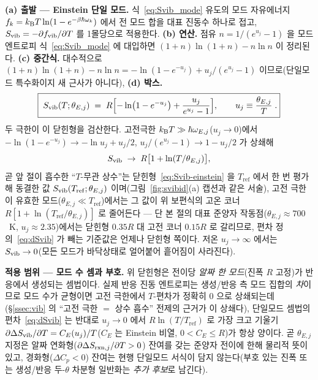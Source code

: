 \textbf{(a) 출발 --- Einstein 단일 모드.} 식~\eqref{eq:Svib_mode} 유도의 모드 자유에너지
$f_k=k_{\mathrm B} T\ln(1-e^{-\beta\hbar\omega_k})$ 에서 전 모드 합을 대표 진동수 하나로 접고, $S_{\mathrm{vib}}=-\partial
f_{\mathrm{vib}}/\partial T$ 를 1몰당으로 적용한다. \textbf{(b) 연산.} 점유 $n=1/(e^{u_j}-1)$ 을 모드 엔트로피
식~\eqref{eq:Svib_mode} 에 대입하면 $(1+n)\ln(1+n)-n\ln n$ 이 정리된다. \textbf{(c) 중간식.} 대수적으로
$(1+n)\ln(1+n)-n\ln n=-\ln(1-e^{-u_j})+u_j/(e^{u_j}-1)$ 이므로(단일모드 특수화이지 새 근사가 아니다),
\textbf{(d) 박스.}
\begin{equation}
\boxed{\;S_{\mathrm{vib}}(T;\theta_{E,j}) \;=\; R\Bigl[-\ln\bigl(1-e^{-u_j}\bigr)+\frac{u_j}{e^{u_j}-1}\Bigr],
\qquad u_j\equiv\frac{\theta_{E,j}}{T}\;.}
\label{eq:Svib-einstein}
\end{equation}
두 극한이 이 닫힌형을 검산한다. 고전극한 $k_{\mathrm B} T\gg\hbar\omega_{E,j}$($u_j\to0$)에서
$-\ln(1-e^{-u_j})\to-\ln u_j+u_j/2$, $u_j/(e^{u_j}-1)\to1-u_j/2$ 가 상쇄해
\[
S_{\mathrm{vib}}\;\to\;R\bigl[1+\ln(T/\theta_{E,j})\bigr],
\]
곧 앞 절이 흡수한 ``$T$-무관 상수''는 닫힌형~\eqref{eq:Svib-einstein} 을 $T_\mathrm{ref}$ 에서 한 번 평가해
동결한 값 $S_{\mathrm{vib}}(T_\mathrm{ref};\theta_{E,j})$ 이며(그림~\ref{fig:svibid}(a) 캡션과 같은 서술), 고전 극한이
유효한 모드($\theta_{E,j}\ll T_\mathrm{ref}$)에서는 그 값이 위 보편식의 고온 코너
$R[1+\ln(T_\mathrm{ref}/\theta_{E,j})]$ 로 줄어든다 --- 단 본 절의 대표 준양자 작동점($\theta_{E,j}{\approx}700$~K,
$u_j{\approx}2.35$)에서는 닫힌형 $0.35R$ 대 고전 코너 $0.15R$ 로 갈리므로, 편차 정의~\eqref{eq:dSvib} 가 빼는
기준값은 언제나 닫힌형 쪽이다. 저온 $u_j\to\infty$ 에서는 $S_{\mathrm{vib}}\to0$(모든 모드가 바닥상태로 얼어붙어
흩어짐이 사라진다).

\textbf{적용 범위 --- 모드 수 셈과 부호.} 위 닫힌형은 전이당 \emph{알짜 한 모드}(진폭 $R$ 고정)가 반응에서
생성되는 셈법이다. 실제 반응 진동 엔트로피는 생성/반응 측 모드 집합의 \emph{차}이므로 모드 수가 균형이면
고전 극한에서 $T$-편차가 정확히 $0$ 으로 상쇄되는데(\S\ref{ssec:vib} 의 ``고전 극한 $=$ 상수 흡수'' 전제의
근거가 이 상쇄다), 단일모드 셈법의 편차~\eqref{eq:dSvib} 는 반대로 $u_j\to0$ 에서 $R\ln(T/T_\mathrm{ref})$ 로
가장 크고 기울기 $\partial\Delta S_{\mathrm{vib}}/\partial T=C_E(u_j)/T$($C_E$ 는 Einstein 비열, $0<C_E\le R$)가 항상
양이다. 곧 $\theta_{E,j}$ 지정은 알짜 연화형($\partial\Delta S_{\mathrm{rxn},j}/\partial T>0$) 잔여를 갖는 준양자
전이에 한해 물리적 뜻이 있고, 경화형($\Delta C_p<0$) 잔여는 현행 단일모드 서식이 담지 않는다(부호 있는
진폭 또는 생성/반응 두-$\theta$ 차분형 일반화는 \emph{추가 후보}로 남긴다).


